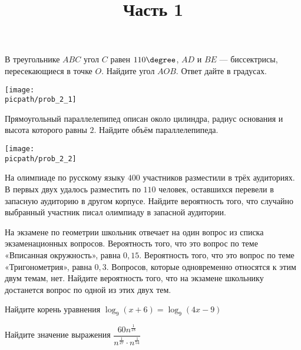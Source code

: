 %
%

\begin{training}[1]
	\title{Часть 1}
	\egepreambone
	\begin{listofex}
		\item
		\begin{minipage}[t]{\bodywidth}
			В треугольнике \( ABC \) угол \( C \) равен \( 110\degree \), \( AD \) и \( BE \) --- биссектрисы, пересекающиеся в точке \( O \). Найдите угол \( AOB \). Ответ дайте в градусах.
			\foranswer
		\end{minipage}
		\gapwidth
		\begin{minipage}[t]{\picwidth}
			\texttt{[image: \\picpath/prob\_2\_1]}
		\end{minipage}
		\item
		\begin{minipage}[t]{\bodywidth}
			Прямоугольный параллелепипед описан около цилиндра, радиус основания и высота которого равны \( 2 \). Найдите объём параллелепипеда.
			\foranswer
		\end{minipage}
		\gapwidth
		\begin{minipage}[t]{\picwidth}
			\texttt{[image: \\picpath/prob\_2\_2]}
		\end{minipage}
		\item На олимпиаде по русскому языку \( 400 \) участников разместили в трёх аудиториях. В первых двух удалось разместить по \( 110 \) человек, оставшихся перевели в запасную аудиторию в другом корпусе. Найдите вероятность того, что случайно выбранный участник писал олимпиаду в запасной аудитории.
		\foranswer
		\item На экзамене по геометрии школьник отвечает на один вопрос из списка экзаменационных вопросов. Вероятность того, что это вопрос по теме «Вписанная окружность», равна \( 0,15 \). Вероятность того, что это вопрос по теме «Тригонометрия», равна \( 0,3 \). Вопросов, которые одновременно относятся к этим двум темам, нет. Найдите вероятность того, что на экзамене школьнику достанется вопрос по одной из этих двух тем.
		\foranswer
	\end{listofex}
	\newpage
	\phantom{Часть 1}
	\begin{listofex}[resume]
		\item Найдите корень уравнения \( \log_9(x+6)=\log_9(4x-9) \)
		\foranswer
		\item Найдите значение выражения \( \dfrac{60n^{\tfrac{1}{18}}}{n^{\tfrac{1}{27}}\cdot n^{\tfrac{1}{54}}} \)

\end{listofex}
\end{training}
